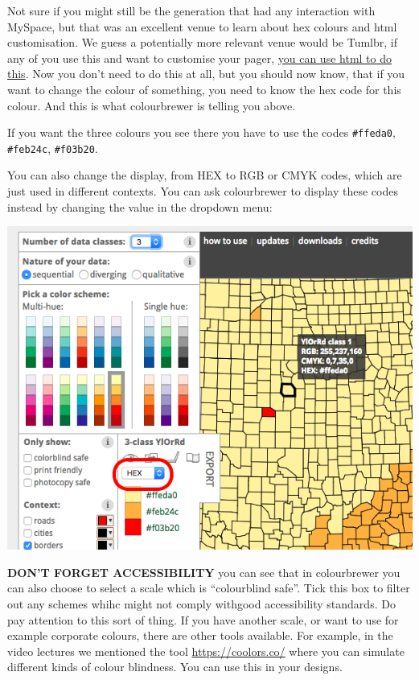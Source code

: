 \documentclass[
]{book}
\begin{document}
Not sure if you might still be the generation that had any interaction with MySpace, but that was an excellent venue to learn about hex colours and html customisation. We guess a potentially more relevant venue would be Tumlbr, if any of you use this and want to customise your pager, \href{https://www.tumblr.com/docs/en/custom_themes}{you can use html to do this}. Now you don't need to do this at all, but you should now know, that if you want to change the colour of something, you need to know the hex code for this colour. And this is what colourbrewer is telling you above.

If you want the three colours you see there you have to use the codes \texttt{\#ffeda0}, \texttt{\#feb24c}, \texttt{\#f03b20}.

You can also change the display, from HEX to RGB or CMYK codes, which are just used in different contexts. You can ask colourbrewer to display these codes instead by changing the value in the dropdown menu:

\includegraphics{imgs/choose_col_code.png}

\textbf{DON'T FORGET ACCESSIBILITY} you can see that in colourbrewer you can also choose to select a scale which is ``colourblind safe''. Tick this box to filter out any schemes whihc might not comply withgood accessibility standards. Do pay attention to this sort of thing. If you have another scale, or want to use for example corporate colours, there are other tools available. For example, in the video lectures we mentioned the tool \url{https://coolors.co/} where you can simulate different kinds of colour blindness. You can use this in your designs.
\end{document}
